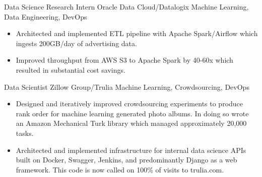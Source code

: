 \documentclass[11pt,a4paper,sans]{moderncv} %
\begin{document}
		{Data Science Research Intern}
		{Oracle Data Cloud/Datalogix}
		{Machine Learning, Data Engineering, DevOps}
		{}
		{
			\begin{itemize}
			\item Architected and implemented ETL pipeline with Apache Spark/Airflow which ingests 200GB/day of advertising data.
			\item Improved throughput from AWS S3 to Apache Spark by 40-60x which resulted in substantial cost savings.
			\end{itemize}
		}

		{Data Scientist}
		{Zillow Group/Trulia}
		{Machine Learning, Crowdsourcing, DevOps}
		{}
		{
			\begin{itemize}
				\item Designed and iteratively improved crowdsourcing experiments to produce rank order for machine learning generated photo albums. In doing so wrote an Amazon Mechanical Turk library which managed approximately 20,000 tasks.
				\item Architected and implemented infrastructure for internal data science APIs built on Docker, Swagger, Jenkins, and predominantly Django as a web framework. This code is now called on 100\% of visits to trulia.com.
			\end{itemize}
		}
\end{document}

